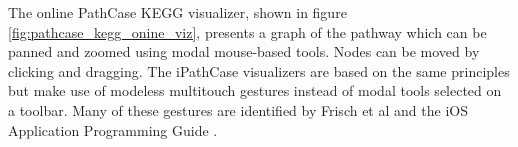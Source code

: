 The online PathCase KEGG visualizer, shown in figure
\ref{fig:pathcase_kegg_onine_viz}, presents a graph of the pathway which can be
panned and zoomed using modal mouse-based tools. Nodes can be moved by clicking
and dragging. The iPathCase visualizers are based on the same principles but
make use of modeless multitouch gestures instead of modal tools selected on a
toolbar. Many of these gestures are identified by Frisch et al
\cite{multitouch:gestures} and the iOS Application Programming Guide
\cite{ios:application-programming-guide}.
